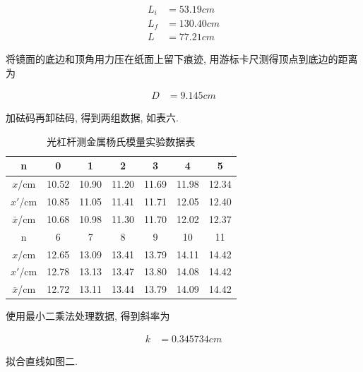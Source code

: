 \documentclass[a4paper,10pt,notitlepage]{article}
\begin{document}
\begin{align*}
	L_i &= 53.19 cm \\
	L_f &= 130.40 cm \\
	L &= 77.21 cm 
\end{align*}

	将镜面的底边和顶角用力压在纸面上留下痕迹, 用游标卡尺测得顶点到底边的距离为
	
\begin{align*}
	D &= 9.145 cm 
\end{align*}

	加砝码再卸砝码, 得到两组数据, 如表六. \\
	
\begin{center}

	\begin{longtable}{|c|c|c|c|c|c|c|}
	\caption{光杠杆测金属杨氏模量实验数据表} \\
	\hline
	n & 0 & 1 & 2 & 3 & 4 & 5 \\
	\hline
	$x$/cm & 10.52 & 10.90 & 11.20 & 11.69 & 11.98 & 12.34 \\
	\hline
	$x'$/cm & 10.85 & 11.05 & 11.41 & 11.71 & 12.05 & 12.40 \\
	\hline
	$\bar{x}$/cm & 10.68 & 10.98 & 11.30 & 11.70 & 12.02 & 12.37 \\
	\hline
	\hline
	n & 6 & 7 & 8 & 9 & 10 & 11 \\
	\hline
	$x$/cm & 12.65 & 13.09 & 13.41 & 13.79 & 14.11 & 14.42 \\
	\hline
	$x'$/cm & 12.78 & 13.13 & 13.47 & 13.80 & 14.08 & 14.42 \\
	\hline
	$\bar{x}$/cm & 12.72 & 13.11 & 13.44 & 13.79 & 14.09 & 14.42 \\
	\hline
	\end{longtable}

\end{center}
	
	使用最小二乘法处理数据, 得到斜率为
	
\begin{align*}
	k &= 0.345734 cm 
\end{align*}

	拟合直线如图二. \\
	
\end{document}
